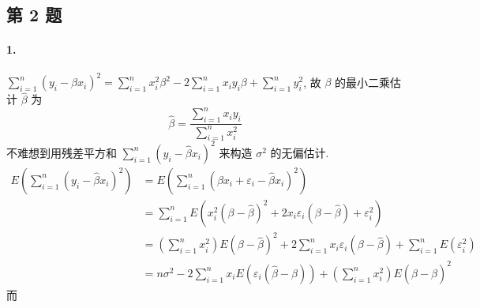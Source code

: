 \documentclass[../main.tex]{subfiles}
\begin{document}
\subsection{第 2 题}
\noindent\paragraph*{1.}
$\sum_{i = 1}^{n} \left( y_i - \beta x_i \right)^2 = \sum_{i = 1}^{n} x_i^2 \beta^2 - 2 \sum_{i = 1}^{n} x_i y_i \beta + \sum_{i = 1}^{n} y_i^2$,
故 $\beta$ 的最小二乘估计 $\widehat{\beta}$ 为
\[
    \widehat{\beta} = \frac{\sum_{i = 1}^{n} x_i y_i}{\sum_{i = 1}^{n} x_i^2}
\]
不难想到用残差平方和 $\sum_{i = 1}^{n} ( y_i - \widehat{\beta} x_i )^2$ 来构造 $\sigma^2$ 的无偏估计.
\begin{align*}
    E \left( \sum_{i = 1}^{n} ( y_i - \widehat{\beta} x_i )^2 \right)
    &= E \left( \sum_{i = 1}^{n} \left( \beta x_i + \varepsilon_i - \widehat{\beta} x_i \right)^2 \right) \\
    &= \sum_{i = 1}^{n} E \left( x_i^2 ( \beta - \widehat{\beta} )^2 + 2 x_i \varepsilon_i ( \beta - \widehat{\beta} ) + \varepsilon_i^2 \right) \\
    &= \left( \sum_{i = 1}^{n} x_i^2 \right) E (\beta - \widehat{\beta})^2 + 2 \sum_{i = 1}^{n} x_i \varepsilon_i (\beta - \widehat{\beta}) + \sum_{i = 1}^{n} E \left( \varepsilon_i^2 \right) \\
    &= n \sigma^2 - 2 \sum_{i = 1}^{n} x_i E (\varepsilon_i (\widehat{\beta} - \beta)) + \left( \sum_{i = 1}^{n} x_i^2 \right) E (\widehat{\beta} - \beta)^2
\end{align*}
而
\end{document}
